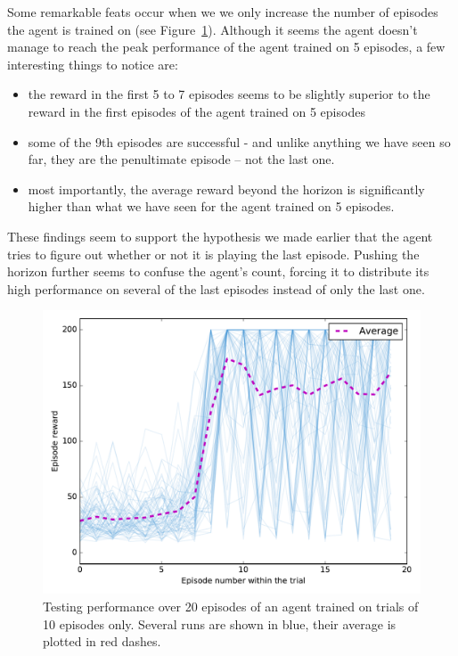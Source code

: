 Some remarkable feats occur when we we only increase the number of episodes the
agent is trained on (see Figure~\ref{fig:horizon_10_3perms}). 
Although it seems the agent doesn't manage to reach
the peak performance of the agent trained on 5 episodes, a few interesting
things to notice are:

\begin{itemize}
	\item the reward in the first 5 to 7 episodes seems to be slightly
		superior to the reward in the first episodes of the agent trained
		on 5 episodes
	\item some of the 9th episodes are successful - and unlike anything
		we have seen so far, they are the penultimate episode -- not
		the last one.
	\item most importantly, the average reward beyond the horizon is
		significantly higher than what we have seen for the agent
		trained on 5 episodes.
\end{itemize}

These findings seem to support the hypothesis we made earlier that the agent
tries to figure out whether or not it is playing the last episode. Pushing
the horizon further seems to confuse the agent's count, forcing it 
to distribute its high performance on several of the last episodes instead
of only the last one.\\

\begin{figure}[H]
	\centering
	\includegraphics[width=0.8\linewidth]{fig/horizon_10_3perms.pdf}
	\caption{Testing performance over 20 episodes of an agent trained on 
	trials of 10 episodes only. 
	Several runs are shown in blue, their average is plotted in red dashes.}
	\label{fig:horizon_10_3perms}
\end{figure}


